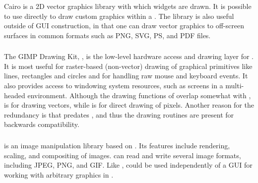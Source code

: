 \documentclass[article,shortnames]{jss}
\begin{document}
Cairo is a 2D vector graphics library with which  widgets
are drawn. It is possible to use  directly to draw custom
graphics within a . The library is also useful
outside of GUI construction, in that one can draw vector graphics to
off-screen surfaces in common formats such as PNG, SVG, PS, and PDF
files.

\subsubsection[GDK]{}

The GIMP Drawing Kit, , is the low-level hardware access and
drawing layer 
for . It is most useful for raster-based (non-vector)
drawing of graphical primitives like lines, rectangles and circles and
for handling raw mouse and keyboard events. It also provides access to
windowing system resources, such as screens in a multi-headed
environment. Although the drawing functions of  overlap
somewhat with ,  is for drawing vectors, while
 is for direct drawing of pixels. Another reason for the
redundancy is that  predates , and thus the
 drawing routines are present for backwards compatibility.

\subsubsection[GdkPixbuf]{}

 is an image manipulation library based on .
Its features
include rendering, scaling, and compositing of images. 
can read
and write several image formats, including JPEG, PNG, and GIF. Like
,
 could be used independently of a GUI for working with
arbitrary 
graphics in . 

\subsubsection[Pango]{}
\end{document}
